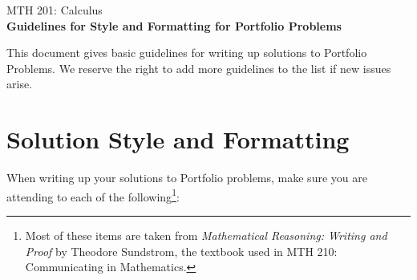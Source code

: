\documentclass[11pt]{article}
\begin{document}
	
	
	\vspace*{0in}

		\begin{center}
			\begin{large}
			MTH 201: Calculus \\
			\textbf{Guidelines for Style and Formatting for Portfolio Problems} \\
			\end{large}
		\end{center}
		
This document gives basic guidelines for writing up solutions to Portfolio Problems. We reserve the right to add more guidelines to the list if new issues arise. 
		
\section*{Solution Style and Formatting}

When writing up your solutions to Portfolio problems, make sure you are attending to each of the following\footnote{Most of these items are taken from \emph{Mathematical Reasoning: Writing and Proof} by Theodore Sundstrom, the textbook used in MTH 210: Communicating in Mathematics.}: 
\end{document}
